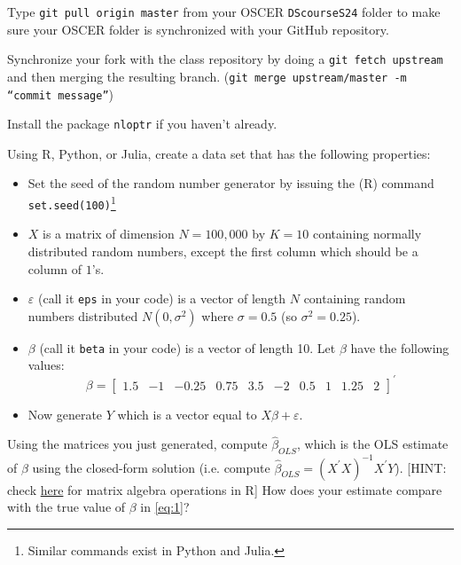 \documentclass[12pt,english]{exam}
\begin{document}
\begin{questions}
\question Type \texttt{git pull origin master} from your OSCER \texttt{DScourseS24} folder to make sure your OSCER folder is synchronized with your GitHub repository. 

\question Synchronize your fork with the class repository by doing a \texttt{git fetch upstream} and then merging the resulting branch. (\texttt{git merge upstream/master -m ``commit message''})

\question Install the package \texttt{nloptr} if you haven't already.

\question Using R, Python, or Julia, create a data set that has the following properties:
\begin{itemize}
    \item Set the seed of the random number generator by issuing the (R) command \texttt{set.seed(100)}\footnote{Similar commands exist in Python and Julia.}
    \item $X$ is a matrix of dimension $N=100,000$ by $K=10$ containing normally distributed random numbers, except the first column which should be a column of $1$'s. 
    \item $\varepsilon$ (call it \texttt{eps} in your code) is a vector of length $N$ containing random numbers distributed $N\left(0,\sigma^{2}\right)$ where $\sigma=0.5$ (so $\sigma^{2} = 0.25$).
    \item $\beta$ (call it \texttt{beta} in your code) is a vector of length 10. Let $\beta$ have the following values:
        \begin{equation}
            \label{eq:1}
           \beta = \left[\begin{array}{cccccccccc}
            1.5 & -1 & -0.25 & 0.75 & 3.5 & -2 & 0.5 & 1 & 1.25 & 2
            \end{array}\right]^{\prime}
        \end{equation}
    \item Now generate $Y$ which is a vector equal to $X\beta + \varepsilon$.
\end{itemize}

\question Using the matrices you just generated, compute $\hat{\beta}_{OLS}$, which is the OLS estimate of $\beta$ using the closed-form solution (i.e. compute $\hat{\beta}_{OLS} = \left(X^{\prime}X\right)^{-1}X^{\prime}Y$). [HINT: check \href{https://www.statmethods.net/advstats/matrix.html}{here} for matrix algebra operations in R] How does your estimate compare with the true value of $\beta$ in \eqref{eq:1}?


\end{questions}
\end{document}
